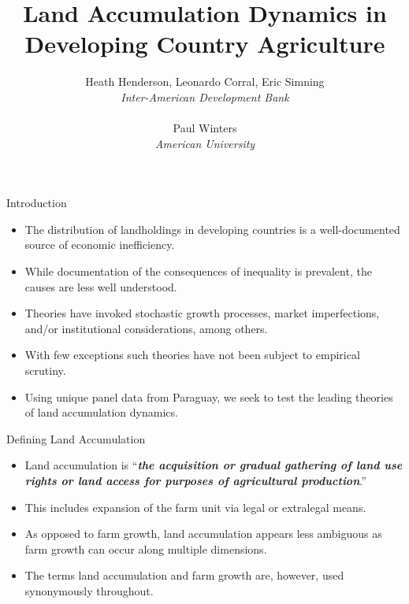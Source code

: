 \documentclass[xcolor=dvipsnames]{beamer}
\title[]{Land Accumulation Dynamics in Developing Country Agriculture}
\author[]{Heath Henderson, Leonardo Corral, Eric Simning \\
\emph{\footnotesize{
Inter-American Development Bank}} \\
~\\
Paul Winters \\
\emph{\footnotesize{American University}}}
\begin{document}
\def\newblock{\hskip .11em plus .33em minus .07em}


\begin{frame}
\titlepage
\end{frame}

\begin{frame}{Introduction}
\begin{itemize}
\item The distribution of landholdings in developing countries is a 
well-documented source of economic inefficiency.
\par\pause\noindent \item While documentation of the consequences of 
inequality is prevalent, the causes are less well understood.
\par\pause\noindent \item Theories have invoked stochastic growth 
processes, market imperfections, and/or institutional considerations, among 
others.
\par\pause\noindent \item With few exceptions such theories have not been 
subject to empirical scrutiny.
\par\pause\noindent \item Using unique panel data from Paraguay, we seek to 
test the leading theories of land accumulation dynamics.
\end{itemize}
\end{frame}

\begin{frame}{Defining Land Accumulation}
\begin{itemize}
\item Land accumulation is ``\textit{\textbf{the acquisition or gradual 
gathering of land use rights or land access for purposes of agricultural 
production}}.''
\par\pause\noindent \item This includes expansion of the farm unit via 
legal or extralegal means.
\par\pause\noindent \item As opposed to farm growth, land accumulation 
appears less ambiguous as farm growth can occur along multiple dimensions.
\par\pause\noindent \item The terms land accumulation and farm growth are, 
however, used synonymously throughout.
\end{itemize}
\end{frame}
\end{document}

